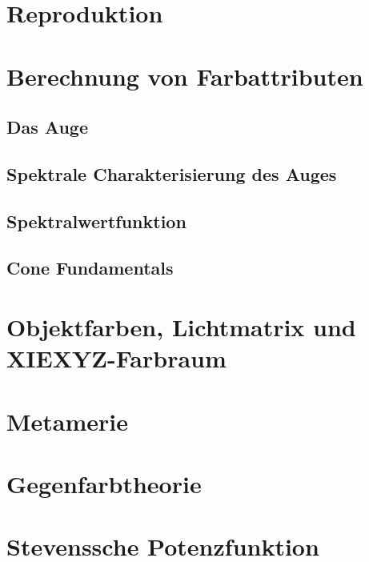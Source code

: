 \documentclass[a4paper, 11pt, accentcolor = tud3b]{tudreport}
\begin{document}
		\section{Reproduktion} %

		\section{Berechnung von Farbattributen} %

			\subsection{Das Auge} %

			\subsection{Spektrale Charakterisierung des Auges} %

			\subsection{Spektralwertfunktion} %

			\subsection{Cone Fundamentals} %

		\section{Objektfarben, Lichtmatrix und XIEXYZ-Farbraum} %

		\section{Metamerie} %

		\section{Gegenfarbtheorie} %

		\section{Stevenssche Potenzfunktion} %
\end{document}
